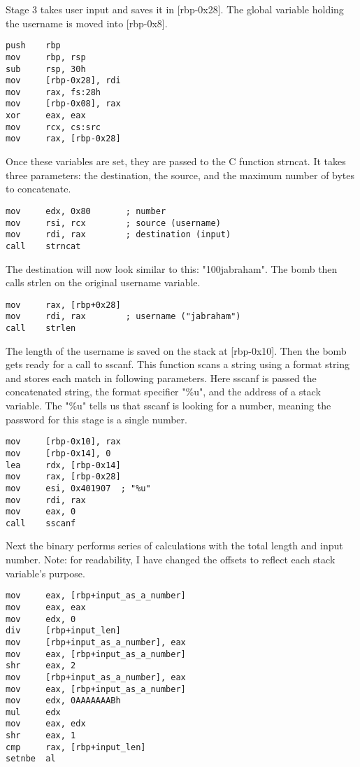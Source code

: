 \documentclass{article}
\begin{document}
\par
Stage 3 takes user input and saves it in [rbp-0x28].  The global variable 
holding the username is moved into [rbp-0x8].
\begin{lstlisting}
push    rbp
mov     rbp, rsp
sub     rsp, 30h
mov     [rbp-0x28], rdi
mov     rax, fs:28h
mov     [rbp-0x08], rax
xor     eax, eax
mov     rcx, cs:src
mov     rax, [rbp-0x28]
\end{lstlisting}
Once these variables are set, they are passed to the C function strncat.  It 
takes three parameters: the destination, the source, and the maximum number of
bytes to concatenate.
\begin{lstlisting}
mov     edx, 0x80       ; number
mov     rsi, rcx        ; source (username)
mov     rdi, rax        ; destination (input)
call    strncat
\end{lstlisting}
\par
The destination will now look similar to this: "100jabraham".  The bomb then 
calls strlen on the original username variable.
\begin{lstlisting}
mov     rax, [rbp+0x28]
mov     rdi, rax        ; username ("jabraham")
call    strlen
\end{lstlisting}
\par
The length of the username is saved on the stack at [rbp-0x10].  Then the bomb
gets ready for a call to sscanf.  This function scans a string using a format
string and stores each match in following parameters.  Here sscanf is passed 
the concatenated string, the format specifier "\%u", and the address of a 
stack variable.  The "\%u" tells us that sscanf is looking for a number, 
meaning the password for this stage is a single number.  
\begin{lstlisting}
mov     [rbp-0x10], rax
mov     [rbp-0x14], 0
lea     rdx, [rbp-0x14]
mov     rax, [rbp-0x28]
mov     esi, 0x401907  ; "%u"
mov     rdi, rax
mov     eax, 0
call    sscanf
\end{lstlisting}
\par
Next the binary performs series of calculations with the total length and 
input number.  Note: for readability, I have changed the offsets to reflect
each stack variable's purpose.
\begin{lstlisting}
mov     eax, [rbp+input_as_a_number]
mov     eax, eax
mov     edx, 0
div     [rbp+input_len]
mov     [rbp+input_as_a_number], eax
mov     eax, [rbp+input_as_a_number]
shr     eax, 2
mov     [rbp+input_as_a_number], eax
mov     eax, [rbp+input_as_a_number]
mov     edx, 0AAAAAAABh
mul     edx
mov     eax, edx
shr     eax, 1
cmp     rax, [rbp+input_len]
setnbe  al
\end{lstlisting}
\end{document}
